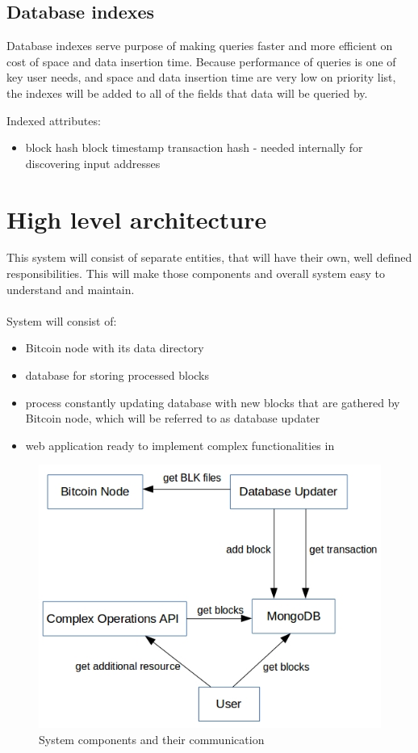 \documentclass[12pt, en, eng, oneside, final]{mgr}
\begin{document}
 

\subsection{Database indexes}

Database indexes serve purpose of making queries faster and more efficient on cost of space and data insertion time.
Because performance of queries is one of key user needs, and space and data insertion time are very low on priority list, the indexes will be added to all of the fields that data will be queried by.

Indexed attributes:
\begin{itemize}
\item
block hash
block timestamp
transaction hash - needed internally for discovering input addresses
\end{itemize} 


\section{High level architecture}
This system will consist of separate entities, that will have their own, well defined responsibilities. This will make those components and overall system easy to understand and maintain.
\\
\\
System will consist of:
\begin{itemize}
\item
Bitcoin node with its data directory
\item
database for storing processed blocks
\item
process constantly updating database with new blocks that are gathered by Bitcoin node, which will be referred to as database updater
\item
web application ready to implement complex functionalities in
\end{itemize}

\begin{figure}[H]
  \includegraphics[width=0.8\linewidth]{component-diagram.png}
  \caption{System components and their communication}
  \label{fig:system-components-and-their-communication}
\end{figure}
\end{document}
